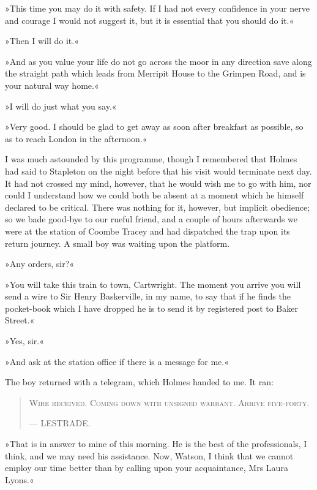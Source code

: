 »This time you may do it with safety. If I had not every confidence in your nerve and courage I would not suggest it, but it is essential that you should do it.«

»Then I will do it.«

»And as you value your life do not go across the moor in any direction save along the straight path which leads from Merripit House to the Grimpen Road, and is your natural way home.«

»I will do just what you say.«

»Very good. I should be glad to get away as soon after breakfast as possible, so as to reach London in the afternoon.«

I was much astounded by this programme, though I re\-mem\-bered that Holmes had said to Stapleton on the night before that his visit would terminate next day. It had not crossed my mind, however, that he would wish me to go with him, nor could I understand how we could both be absent at a moment which he himself declared to be critical. There was nothing for it, however, but implicit obedience; so we bade good-bye to our rueful friend, and a couple of hours afterwards we were at the station of Coombe Tracey and had dispatched the trap upon its return journey. A small boy was waiting upon the platform.

»Any orders, sir?«

»You will take this train to town, Cartwright. The moment you arrive you will send a wire to Sir Henry Baskerville, in my name, to say that if he finds the pocket-book which I have dropped he is to send it by registered post to Baker Street.«

»Yes, sir.«

»And ask at the station office if there is a message for me.«

The boy returned with a telegram, which Holmes handed to me. It ran: 
\begin{samepage}
\blockquote{
\textsc{Wire received. Coming down with unsigned warrant. Arrive five-forty.}
\begin{flushright}
—  {\small\scshape LESTRADE.}
\end{flushright}
}
\end{samepage}

»That is in answer to mine of this morning. He is the best of the professionals, I think, and we may need his assistance. Now, Watson, I think that we cannot employ our time better than by calling upon your acquaintance, Mrs Laura Lyons.«

